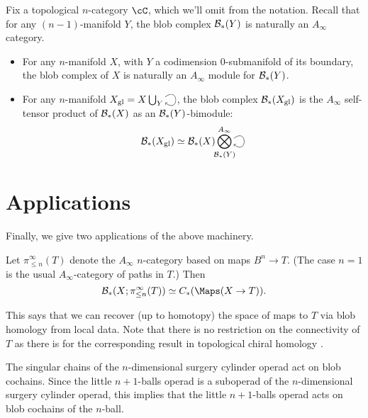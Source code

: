 \documentclass{pnastwo}
\begin{document}
\begin{article}
Fix a topological $n$-category $\cC$, which we'll omit from the notation.
Recall that for any $(n-1)$-manifold $Y$, the blob complex ${\mathcal B}_*(Y)$ is naturally an $A_\infty$ category.

\begin{thm}
\label{thm:gluing}
\mbox{}%
\begin{itemize}
\item For any $n$-manifold $X$, with $Y$ a codimension $0$-submanifold of its boundary, the blob complex of $X$ is naturally an
$A_\infty$ module for ${\mathcal B}_*(Y)$.

\item For any $n$-manifold $X_\text{gl} = X\bigcup_Y \selfarrow$, the blob complex ${\mathcal B}_*(X_\text{gl})$ is the $A_\infty$ self-tensor product of
${\mathcal B}_*(X)$ as an ${\mathcal B}_*(Y)$-bimodule:
\begin{equation*}
\bc_*(X_\text{gl}) \simeq \bc_*(X) \Tensor^{A_\infty}_{\mathclap{\bc_*(Y)}} \selfarrow
\end{equation*}
\end{itemize}
\end{thm}


\section{Applications}
\label{sec:applications}
Finally, we give two applications of the above machinery.

\begin{thm}
\label{thm:map-recon}
Let $\pi^\infty_{\le n}(T)$ denote the $A_\infty$ $n$-category based on maps 
$B^n \to T$.
(The case $n=1$ is the usual $A_\infty$-category of paths in $T$.)
Then 
$$\bc_*(X; \pi^\infty_{\le n}(T)) \simeq \CM{X}{T}.$$
\end{thm}

This says that we can recover (up to homotopy) the space of maps to $T$ via blob homology from local data. 
Note that there is no restriction on the connectivity of $T$ as there is for the corresponding result in topological chiral homology \cite[Theorem 3.8.6]{0911.0018}.


\begin{thm}
\label{thm:deligne}
The singular chains of the $n$-dimensional surgery cylinder operad act on blob cochains.
Since the little $n{+}1$-balls operad is a suboperad of the $n$-dimensional surgery cylinder operad,
this implies that the little $n{+}1$-balls operad acts on blob cochains of the $n$-ball.
\end{thm}


\end{article}
\end{document}
